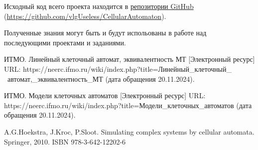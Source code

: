 \documentclass[a4paper, final]{article}
\begin{document}
Исходный код всего проекта находится в \href{https://github.com/vlgUseless/CellularAutomaton}
{репозитории GitHub} (\url{https://github.com/vlgUseless/CellularAutomaton}).

Полученные знания могут быть и будут испольованы в работе над последующими проектами и заданиями.
\cleardoublepage
{}
\newpage
\begin{thebibliography}{0}
	ИТМО. Линейный клеточный автомат, эквивалентность МТ [Электронный ресурс] URL: 
  https://neerc.ifmo.ru/wiki/index.php?title=Линейный\_клеточный\_ \ автомат,\_эквивалентность\_МТ
  (дата обращения 20.11.2024).

	ИТМО. Модели клеточных автоматов [Электронный ресурс] URL: 
  https://neerc.ifmo.ru/wiki/index.php?title=Модели\_клеточных\_автоматов 
  (дата обращения 20.11.2024).

	A.G.Hoekstra, J.Kroc, P.Sloot. Simulating complex systems by cellular automata. Springer, 
  2010. ISBN 978-3-642-12202-6
\end{thebibliography}
\end{document}
